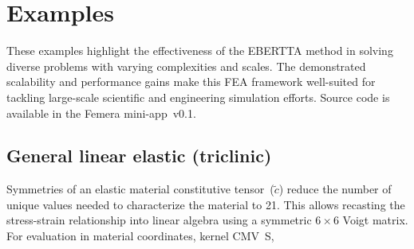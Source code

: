 \documentclass[]             %
{NASA}                       %
\begin{document}
\section{Examples}
\label{sec:Examples}



These examples highlight the effectiveness of the EBERTTA method in solving diverse problems with varying complexities and scales. The demonstrated scalability and performance gains make this FEA framework well-suited for tackling large-scale scientific and engineering simulation efforts. 
Source code is available in the Femera mini-app~v0.1.~\cite{ref:femera-v0.1-source} 

\subsection{General linear elastic (triclinic)}


Symmetries of an elastic material constitutive tensor~($\widetilde{c}$) reduce the number of unique values needed to characterize the material to 21. This allows recasting the stress-strain relationship into linear algebra using a symmetric $6\times6$ Voigt matrix.
For evaluation in material coordinates, kernel CMV~S,
 
\end{document}
